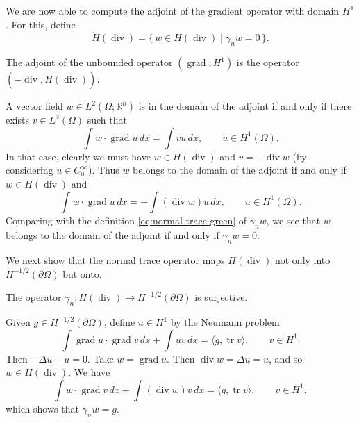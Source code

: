 {We are now able to compute the adjoint of the gradient operator with domain $H^1$. For this, define}
\[
\mathring H(\operatorname{div})=\{\,w\in H(\operatorname{div})\mid\gamma_n w=0\,\}.
\]

\begin{Theorem}\label{thm:gradient-adjoint-zero-normal}
{The adjoint of the unbounded operator $(\operatorname{grad},H^1)$ is the operator $(-\operatorname{div},\mathring H(\operatorname{div}))$.}
\end{Theorem}

\begin{Proof}
{A vector field $w\in L^2(\Omega;\mathbb R^n)$ is in the domain of the adjoint if and only if there exists $v\in L^2(\Omega)$ such that}
\[
\int w\cdot\operatorname{grad}u\,dx=\int vu\,dx,\qquad u\in H^1(\Omega).
\]
{In that case, clearly we must have $w\in H(\operatorname{div})$ and $v=-\operatorname{div}w$ (by considering $u\in C_0^\infty$). Thus $w$ belongs to the domain of the adjoint if and only if $w\in H(\operatorname{div})$ and}
\[
\int w\cdot\operatorname{grad}u\,dx=-\int(\operatorname{div}w)u\,dx,\qquad u\in H^1(\Omega).
\]
{Comparing with the definition \eqref{eq:normal-trace-green} of $\gamma_n w$, we see that $w$ belongs to the domain of the adjoint if and only if $\gamma_n w=0$.}
\end{Proof}

{We next show that the normal trace operator maps $H(\operatorname{div})$ not only into $H^{-1/2}(\partial\Omega)$ but onto.}

\begin{Theorem}\label{thm:normal-trace-surjective}
{The operator $\gamma_n:H(\operatorname{div})\to H^{-1/2}(\partial\Omega)$ is surjective.}
\end{Theorem}

\begin{Proof}
{Given $g\in H^{-1/2}(\partial\Omega)$, define $u\in H^1$ by the Neumann problem}
\[
\int\operatorname{grad}u\cdot\operatorname{grad}v\,dx+\int uv\,dx=\langle g,\operatorname{tr}v\rangle,\qquad v\in H^1.
\]
{Then $-\Delta u+u=0$. Take $w=\operatorname{grad}u$. Then $\operatorname{div}w=\Delta u=u$, and so $w\in H(\operatorname{div})$. We have}
\[
\int w\cdot\operatorname{grad}v\,dx+\int(\operatorname{div}w)v\,dx=\langle g,\operatorname{tr}v\rangle,\qquad v\in H^1,
\]
{which shows that $\gamma_n w=g$.}
\end{Proof}

